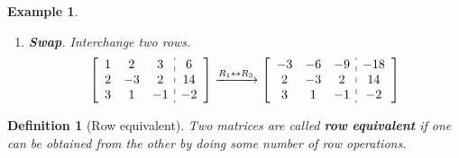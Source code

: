 \documentclass[12pt, a4paper]{article}
\newtheorem{df}{Definition}[subsection]
\newtheorem{eg}{Example}[subsection]
\begin{document}
\begin{eg}
\begin{enumerate}
$$\left[\begin{array}{c:c}\begin{matrix}1&2&3\\2&-3&2\\3&1&-1\end{matrix}&\begin{matrix}6\\14\\-2\end{matrix}\end{array}\right]\xrightarrow[]{R_2=R_2-2\times R_1} \left[\begin{array}{c:c}\begin{matrix}1&2&3\\0&-7&-4\\3&1&-1\end{matrix}&\begin{matrix}6\\2\\-2\end{matrix}\end{array}\right]$$
\item \textbf{Swap}. Interchange two rows. 
$$\left[\begin{array}{c:c}\begin{matrix}1&2&3\\2&-3&2\\3&1&-1\end{matrix}&\begin{matrix}6\\14\\-2\end{matrix}\end{array}\right]\xrightarrow[]{R_1\leftrightarrow R_3} \left[\begin{array}{c:c}\begin{matrix}-3&-6&-9\\2&-3&2\\3&1&-1\end{matrix}&\begin{matrix}-18\\14\\-2\end{matrix}\end{array}\right]$$
\end{enumerate}
\end{eg}

\begin{df}[Row equivalent]
Two matrices are called \textbf{row equivalent} if one can be obtained from the other by doing some number of row operations. 
\end{df}
\end{document}

